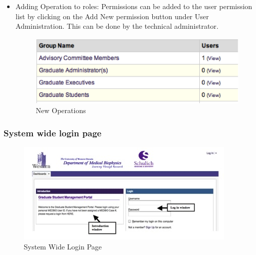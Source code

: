 \documentclass[11pt,a4paper]{report}
\begin{document}
\begin{itemize}
\begin{itemize}
\item Adding Operation to roles: Permissions can be added to the user permission list by clicking on the Add New permission button under User Administration. This can be done by the technical administrator.

\begin{figure}[htp]
\centering
\includegraphics[scale=1]{diagrams/HTMLTemplating/Figure9.png}
\caption{New Operations}
\label{fig:NewPermission}
\end{figure}


\end{itemize}
\end{itemize}

\subsubsection{ System wide login page }

\begin{figure}[htp]
\centering
\includegraphics[scale=1]{diagrams/HTMLTemplating/Figure1.jpg}
\caption{System Wide Login Page}
\label{fig:SystemWideLogin}
\end{figure}
\end{document}
